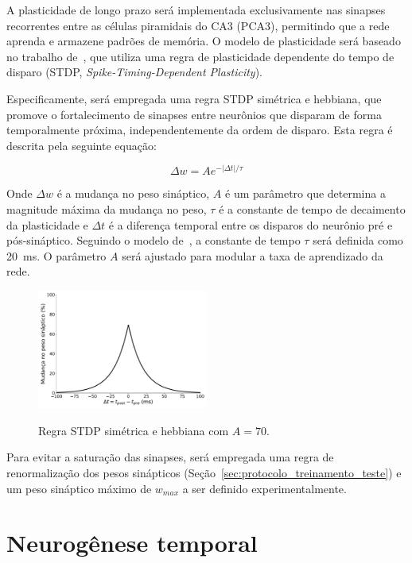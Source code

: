 A plasticidade de longo prazo será implementada exclusivamente nas sinapses recorrentes entre as células piramidais do CA3 (PCA3),
permitindo que a rede aprenda e armazene padrões de memória. O modelo de plasticidade será baseado no trabalho
de~, que utiliza uma regra de plasticidade dependente do tempo de disparo (STDP,
\textit{Spike-Timing-Dependent Plasticity}).

Especificamente, será empregada uma regra STDP simétrica e hebbiana, que promove o fortalecimento de sinapses entre neurônios que
disparam de forma temporalmente próxima, independentemente da ordem de disparo. Esta regra é descrita pela seguinte equação: 

\begin{equation}
    \label{eq:stdp}
    \Delta w = A e^{-|\Delta t|/\tau}
\end{equation}

Onde $\Delta w$ é a mudança no peso sináptico, $A$ é um parâmetro que determina a magnitude máxima da mudança no peso, $\tau$ é a
constante de tempo de decaimento da plasticidade e $\Delta t$ é a diferença temporal entre os disparos do neurônio pré e
pós-sináptico. Seguindo o modelo de~\cite{kopsickFormation2024}, a constante de tempo $\tau$ será definida como
\SI{20}{\milli\second}. O parâmetro $A$ será ajustado para modular a taxa de aprendizado da rede.

\begin{figure}[H]
    \centering
    \caption{Regra STDP simétrica e hebbiana com $A = 70$.}
    \includegraphics[width=0.5\textwidth]{figuras/symmetric_stdp}
    \label{fig:symmetric_stdp}
\end{figure}

Para evitar a saturação das sinapses, será empregada uma regra de renormalização dos pesos sinápticos
(Seção~\ref{sec:protocolo_treinamento_teste}) e um peso sináptico máximo de $w_{max}$ a ser definido experimentalmente.

\section{Neurogênese temporal}

